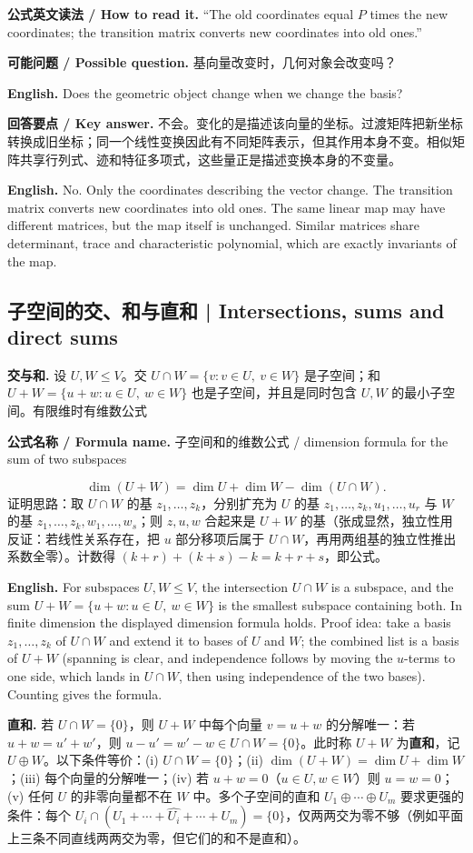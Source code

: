 \documentclass[UTF8,11pt,a4paper]{ctexart}
\newcommand{\EN}[1]{\par\noindent\textbf{English.} #1\par}
\newcommand{\READ}[1]{\par\noindent\textbf{公式英文读法 / How to read it.} #1\par}
\newcommand{\FORMULA}[2]{\par\noindent\textbf{公式名称 / Formula name.} #1 / #2\par}
\newcommand{\ASK}[4]{\par\noindent\textbf{可能问题 / Possible question.} #1\par\EN{#2}\noindent\textbf{回答要点 / Key answer.} #3\par\EN{#4}\medskip}
\begin{document}
\READ{``The old coordinates equal $P$ times the new coordinates; the transition matrix converts new coordinates into old ones.''}
\ASK{基向量改变时，几何对象会改变吗？}{Does the geometric object change when we change the basis?}{不会。变化的是描述该向量的坐标。过渡矩阵把新坐标转换成旧坐标；同一个线性变换因此有不同矩阵表示，但其作用本身不变。相似矩阵共享行列式、迹和特征多项式，这些量正是描述变换本身的不变量。}{No. Only the coordinates describing the vector change. The transition matrix converts new coordinates into old ones. The same linear map may have different matrices, but the map itself is unchanged. Similar matrices share determinant, trace and characteristic polynomial, which are exactly invariants of the map.}

\subsection{子空间的交、和与直和 | Intersections, sums and direct sums}
\noindent\textbf{交与和.} 设 $U,W\le V$。交 $U\cap W=\{v:v\in U,\ v\in W\}$ 是子空间；和 $U+W=\{u+w:u\in U,\ w\in W\}$ 也是子空间，并且是同时包含 $U,W$ 的最小子空间。有限维时有维数公式
\FORMULA{子空间和的维数公式}{dimension formula for the sum of two subspaces}
\[
\dim(U+W)=\dim U+\dim W-\dim(U\cap W).
\]
证明思路：取 $U\cap W$ 的基 $z_1,\dots,z_k$，分别扩充为 $U$ 的基 $z_1,\dots,z_k,u_1,\dots,u_r$ 与 $W$ 的基 $z_1,\dots,z_k,w_1,\dots,w_s$；则 $z,u,w$ 合起来是 $U+W$ 的基（张成显然，独立性用反证：若线性关系存在，把 $u$ 部分移项后属于 $U\cap W$，再用两组基的独立性推出系数全零）。计数得 $(k+r)+(k+s)-k=k+r+s$，即公式。
\EN{For subspaces $U,W\le V$, the intersection $U\cap W$ is a subspace, and the sum $U+W=\{u+w:u\in U,\ w\in W\}$ is the smallest subspace containing both. In finite dimension the displayed dimension formula holds. Proof idea: take a basis $z_1,\dots,z_k$ of $U\cap W$ and extend it to bases of $U$ and $W$; the combined list is a basis of $U+W$ (spanning is clear, and independence follows by moving the $u$-terms to one side, which lands in $U\cap W$, then using independence of the two bases). Counting gives the formula.}
\noindent\textbf{直和.} 若 $U\cap W=\{0\}$，则 $U+W$ 中每个向量 $v=u+w$ 的分解唯一：若 $u+w=u'+w'$，则 $u-u'=w'-w\in U\cap W=\{0\}$。此时称 $U+W$ 为\textbf{直和}，记 $U\oplus W$。以下条件等价：(i) $U\cap W=\{0\}$；(ii) $\dim(U+W)=\dim U+\dim W$；(iii) 每个向量的分解唯一；(iv) 若 $u+w=0$（$u\in U,w\in W$）则 $u=w=0$；(v) 任何 $U$ 的非零向量都不在 $W$ 中。多个子空间的直和 $U_1\oplus\cdots\oplus U_m$ 要求更强的条件：每个 $U_i\cap(U_1+\cdots+\widehat{U_i}+\cdots+U_m)=\{0\}$，仅两两交为零不够（例如平面上三条不同直线两两交为零，但它们的和不是直和）。
\end{document}

